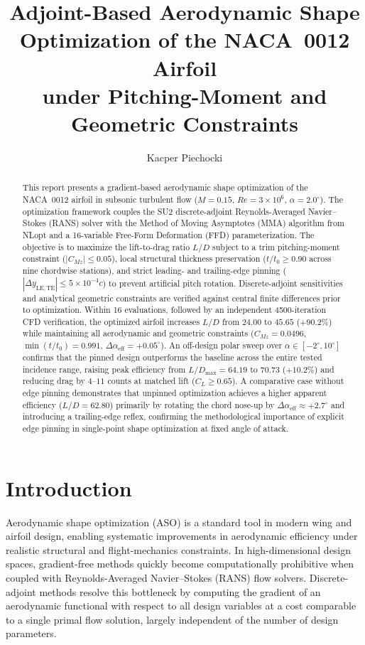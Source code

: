 \documentclass[11pt,a4paper]{article}
\title{\textbf{Adjoint-Based Aerodynamic Shape Optimization of the NACA~0012 Airfoil\\
under Pitching-Moment and Geometric Constraints}}
\author{Kacper Piechocki}
\date{}
\begin{document}
\maketitle

\begin{abstract}
This report presents a gradient-based aerodynamic shape optimization of the NACA~0012 airfoil in subsonic turbulent flow ($M = 0.15$, $Re = 3 \times 10^6$, $\alpha = 2.0^\circ$). The optimization framework couples the SU2 discrete-adjoint Reynolds-Averaged Navier--Stokes (RANS) solver with the Method of Moving Asymptotes (MMA) algorithm from NLopt and a 16-variable Free-Form Deformation (FFD) parameterization. The objective is to maximize the lift-to-drag ratio $L/D$ subject to a trim pitching-moment constraint ($|C_{Mz}| \leq 0.05$), local structural thickness preservation ($t/t_0 \geq 0.90$ across nine chordwise stations), and strict leading- and trailing-edge pinning ($|\Delta y_{\mathrm{LE,TE}}| \leq 5\times 10^{-4}c$) to prevent artificial pitch rotation. Discrete-adjoint sensitivities and analytical geometric constraints are verified against central finite differences prior to optimization. Within 16 evaluations, followed by an independent 4500-iteration CFD verification, the optimized airfoil increases $L/D$ from $24.00$ to $45.65$ ($+90.2\%$) while maintaining all aerodynamic and geometric constraints ($C_{Mz} = 0.0496$, $\min(t/t_0) = 0.991$, $\Delta\alpha_{\mathrm{eff}} = +0.05^\circ$). An off-design polar sweep over $\alpha \in [-2^\circ, 10^\circ]$ confirms that the pinned design outperforms the baseline across the entire tested incidence range, raising peak efficiency from $L/D_{\max} = 64.19$ to $70.73$ ($+10.2\%$) and reducing drag by $4$--$11$ counts at matched lift ($C_L \geq 0.65$). A comparative case without edge pinning demonstrates that unpinned optimization achieves a higher apparent efficiency ($L/D = 62.80$) primarily by rotating the chord nose-up by $\Delta\alpha_{\mathrm{eff}} \approx +2.7^\circ$ and introducing a trailing-edge reflex, confirming the methodological importance of explicit edge pinning in single-point shape optimization at fixed angle of attack.
\end{abstract}

\section{Introduction}

Aerodynamic shape optimization (ASO) is a standard tool in modern wing and airfoil design, enabling systematic improvements in aerodynamic efficiency under realistic structural and flight-mechanics constraints. In high-dimensional design spaces, gradient-free methods quickly become computationally prohibitive when coupled with Reynolds-Averaged Navier--Stokes (RANS) flow solvers. Discrete-adjoint methods resolve this bottleneck by computing the gradient of an aerodynamic functional with respect to all design variables at a cost comparable to a single primal flow solution, largely independent of the number of design parameters.
\end{document}
